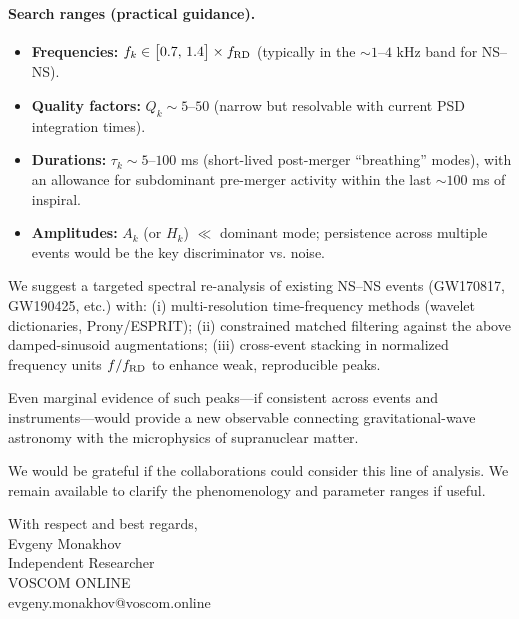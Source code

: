 \documentclass[a4paper,12pt]{article}
\begin{document}
\paragraph{Search ranges (practical guidance).}
\begin{itemize}
  \item \textbf{Frequencies:} $f_k \in \bigl[0.7,\,1.4\bigr]\times f_{\rm RD}$ (typically in the $\sim\!1$--$4$ kHz band for NS--NS).
  \item \textbf{Quality factors:} $Q_k \sim 5$--$50$ (narrow but resolvable with current PSD integration times).
  \item \textbf{Durations:} $\tau_k \sim 5$--$100$ ms (short-lived post-merger ``breathing'' modes), with an allowance for subdominant pre-merger activity within the last $\sim\!100$ ms of inspiral.
  \item \textbf{Amplitudes:} $A_k$ (or $H_k$) $\ll$ dominant mode; persistence across multiple events would be the key discriminator vs. noise.
\end{itemize}

We suggest a targeted spectral re-analysis of existing NS--NS events (GW170817, GW190425, etc.) with:
(i) multi-resolution time-frequency methods (wavelet dictionaries, Prony/ESPRIT); 
(ii) constrained matched filtering against the above damped-sinusoid augmentations; 
(iii) cross-event stacking in normalized frequency units $f/f_{\rm RD}$ to enhance weak, reproducible peaks.

Even marginal evidence of such peaks---if consistent across events and instruments---would provide a new observable connecting gravitational-wave astronomy with the microphysics of supranuclear matter.

We would be grateful if the collaborations could consider this line of analysis. We remain available to clarify the phenomenology and parameter ranges if useful.

With respect and best regards, \\[2ex]

Evgeny Monakhov \\
Independent Researcher \\
VOSCOM ONLINE \\
evgeny.monakhov@voscom.online
\end{document}
